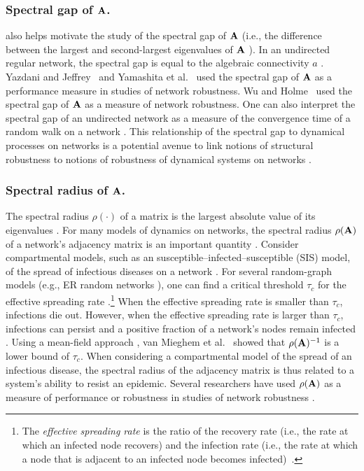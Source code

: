 \documentclass{comnet-mod}
\begin{document}
\subsubsection{Spectral gap of ${\bf A}$.}

 also helps motivate the study of the spectral gap of ${\bf A}$ (i.e., the difference between the largest and second-largest eigenvalues of $\bf A$ \cite[p.\,88]{VanMieghem2023}). In an undirected regular network, the spectral gap is equal to the algebraic connectivity $a$ \cite{Hoory2006, Stanic2013, VanMieghem2023}. 
Yazdani and Jeffrey~\cite{Yazdani2011} and Yamashita et al.~\cite{Yamashita2019} used the spectral gap of ${\bf A}$ as a performance measure in studies of network robustness. Wu and Holme~\cite{Wu2011} used the spectral gap of $\bf A$ as a measure of network robustness. One can also interpret the spectral gap of an undirected network as a measure of the convergence time of a random walk on a network \cite[p.\,109]{VanMieghem2023}. This relationship of the spectral gap to dynamical processes on networks is a potential avenue to link notions of structural robustness to notions of robustness of dynamical systems on networks \cite{Li2013}. 


\subsubsection{Spectral radius of ${\bf A}$.}

The spectral radius $\rho(\cdot)$ of a matrix is the largest absolute value of its eigenvalues \cite[p.\,195]{Lax2002}. For many models of dynamics on networks, the spectral radius $\rho({\bf A})$ of a network's adjacency matrix is an important quantity \cite{Barnett2009, Pastor-Satorras2001}. Consider compartmental models, such as an susceptible--infected--susceptible (SIS) model, of the spread of infectious diseases on a network \cite{Pastor-Satorras2015}. For several random-graph models (e.g., ER random networks \cite[p.\,343]{Newman2018}), one can find a critical threshold $\tau_c$ for the effective spreading rate \cite{Boguna2002, Miller2009, VanMieghem2009}.\footnote{The \textit{effective spreading rate} is the ratio of the recovery rate (i.e., the rate at which an infected node recovers) and the infection rate (i.e., the rate at which a node that is adjacent to an infected node becomes infected)~\cite{Pastor-Satorras2015}.} 
When the effective spreading rate is smaller than $\tau_c$, infections die out. However, when the effective spreading rate is larger than $\tau_c$, infections can persist and a positive fraction of a network's nodes remain infected \cite{VanMieghem2009}.
Using a mean-field approach \cite[p.\,37]{Porter2016}, van Mieghem et al.~\cite{VanMieghem2009} showed that $\rho({\bf A})^{-1}$ is a lower bound of $\tau_c$. 
When considering a compartmental model of the spread of an infectious disease, the spectral radius of the adjacency matrix is thus related to a system's ability to resist an epidemic. Several researchers have used $\rho({\bf A})$ as a measure of performance or robustness in studies of network robustness \cite{Jamakovic2006, Bilal2013, Yamashita2019}.
\end{document}
